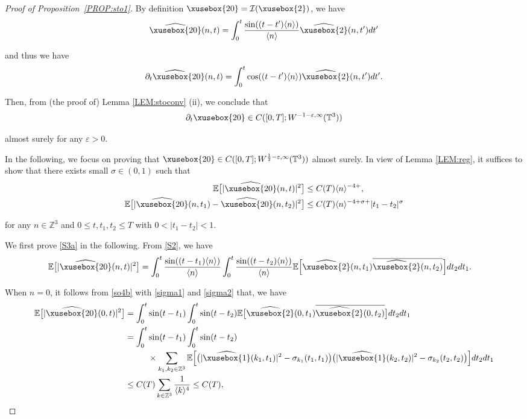 \documentclass[%
11pt,  reqno]{amsart}
\def\<#1>{\xusebox{#1}}
\newcommand{\1}{\hspace{0.2mm}\text{I}\hspace{0.2mm}}
\newcommand{\noi}{\noindent}
\newcommand{\Z}{\mathbb{Z}}
\newcommand{\T}{\mathbb{T}}
\newcommand{\E}{\mathbb{E}}
\newcommand{\eps}{\varepsilon}
\newcommand{\s}{\sigma}
\newcommand{\ft}{\widehat}
\newcommand{\cj}{\overline}
\newcommand{\dt}{\partial_t}
\newcommand{\jb}[1]
{\langle #1 \rangle}
\newcommand{\I}{\mathcal{I}}
\numberwithin{equation}{section}
\numberwithin{theorem}{section}
\begin{document}
\begin{proof}[Proof of Proposition~\ref{PROP:sto1}]



By definition  $\<20> = \I(\<2>)$, we have
\begin{align}
\ft{\<20>}(n, t)
=  \int_0^t \frac{\sin((t - t') \jb{n})}{\jb{n}}  \ft{\<2>}(n, t')dt'
\label{S2}
\end{align}

\noi
and thus  we have 
\begin{align*}
\ft{\dt \<20>}(n, t)
=  \int_0^t \cos((t - t') \jb{n})  \ft{\<2>}(n, t')dt'.
\end{align*}

\noi
Then, from (the proof of) Lemma \ref{LEM:stoconv} (ii), 
we conclude that 
\[\dt \<20> \in  C([0,T];W^{-1 -\eps,\infty}(\T^3))\]

\noi
almost surely for any $\eps >0$.


In the following, 
we focus on proving that
$\<20> \in C([0,T];W^{\frac 12 -\eps,\infty}(\T^3))$
almost surely.
In view of Lemma \ref{LEM:reg}, it suffices to show that 
there exists small $\s \in (0, 1)$ such that 
\begin{align}
\E \big[ |\ft{\<20>}(n, t)|^2\big] & \le C(T) \jb{n}^{-4+},
\label{S3a}\\
\E \big[ |\ft{\<20>}(n, t_1) - \ft{\<20>}(n, t_2)|^2\big] 
& \le C(T) \jb{n}^{-4 + \s + }|t_1 - t_2|^\s  
\label{S3b}
\end{align}


\noi
for any $n \in \Z^3$ and  $0 \leq t, t_1, t_2 \leq T$
with $0 < |t_1 - t_2| < 1$.







\smallskip

We first prove \eqref{S3a} in the following.
From \eqref{S2}, 
we have 
\begin{align}
\E \big[ |\ft{\<20>}(n, t)|^2\big]
& = 
 \int_0^t \frac{\sin((t - t_1) \jb{n})}{\jb{n}} 
 \int_0^t \frac{\sin((t - t_2) \jb{n})}{\jb{n}} 
\E\Big[ \ft{\<2>}(n, t_1) \cj{\ft{\<2>}(n, t_2)} \Big]  dt_2dt_1.
\label{S4}
\end{align}


\noi
When $n = 0$, it follows from 
\eqref{so4b} with \eqref{sigma1} and \eqref{sigma2} that, we have
\begin{align*}
\E \big[ |\ft{\<20>}(0, t)|^2\big]
& = 
 \int_0^t \sin (t - t_1) 
 \int_0^t \sin (t-t_2) 
\E\big[ \ft{\<2>}(0, t_1) \cj{\ft{\<2>}(0, t_2)} \big]  dt_2dt_1\notag\\
& = 
 \int_0^t \sin (t - t_1) 
 \int_0^t \sin (t-t_2) \notag \\
& \hphantom{XXX}
\times
\sum_{k_1, k_2 \in \Z^3}
\E\Big[\big( |\ft{\<1>}(k_1, t_1)|^2 -  \s_{k_1}(t_1, t_1)\big)\big( |\ft{\<1>}(k_2, t_2)|^2 -  \s_{k_2}(t_2, t_2)\big)\Big] 
 dt_2dt_1\notag\\
& \leq C(T) \sum_{k \in \Z^3}\frac{1}{\jb{k}^4}
 \leq C(T),
\end{align*}


\end{proof}
\end{document}
